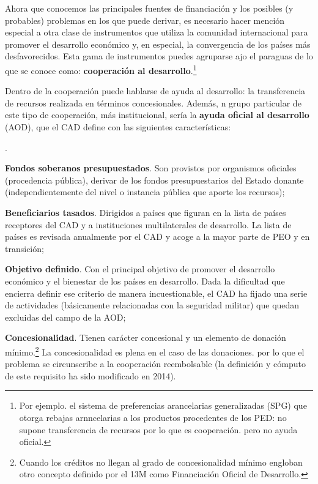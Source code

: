 \documentclass[10pt,a4paper]{article}
\newcounter{numitem}
\newenvironment{lnum}
      {\begin{list}{\arabic{numitem}.}{%
          \usecounter{numitem}%
          \setlength{\leftmargin}{1cm}%
          \setlength{\parskip}{3pt}%
          \setlength{\itemsep}{0pt}%
          \setlength{\parsep}{0pt}%
      }}
      {\end{list}}
\begin{document}
Ahora que conocemos las principales fuentes de financiación y los posibles (y probables) problemas en los que puede derivar, es necesario hacer mención especial a otra clase de instrumentos que utiliza la comunidad internacional para promover el desarrollo económico y, en especial, la convergencia de los países más desfavorecidos. Esta gama de instrumentos puedes agruparse ajo el paraguas de lo que se conoce como: \textbf{cooperación al desarrollo}.\footnote{%
    Por ejemplo. el sistema de preferencias arancelarias generalizadas (SPG) que otorga rebajas arnncelarias a los productos procedentes de los PED: no supone transferencia de recursos por lo que es cooperación. pero no ayuda oficial.
}

Dentro de la cooperación puede hablarse de ayuda al desarrollo: la transferencia de recursos realizada en términos concesionales. Además, n grupo particular de este tipo de cooperación, más institucional, sería la \textbf{ayuda oficial al desarrollo} (AOD), que el CAD define con las siguientes características:
\begin{lnum}
    \item \textbf{Fondos soberanos presupuestados}. Son provistos por organismos oficiales (procedencia pública), derivar de los fondos presupuestarios del Estado donante (independientemente del nivel o instancia pública que aporte los recursos);
    \item \textbf{Beneficiarios tasados}. Dirigidos a países que figuran en la lista de países receptores del CAD y a instituciones multilaterales de desarrollo. La lista de países es revisada anualmente por el CAD y acoge a la mayor parte de PEO y en transición;
    \item \textbf{Objetivo definido}. Con el principal objetivo de promover el desarrollo económico y el bienestar de los países en desarrollo. Dada la dificultad que encierra definir ese criterio de manera incuestionable, el CAD ha fijado una serie de actividades (básicamente relacionadas con la seguridad militar) que quedan excluidas del campo de la AOD;
    \item \textbf{Concesionalidad}. Tienen carácter concesional y un elemento de donación mínimo.\footnote{%
        Cuando los créditos no llegan al grado de concesionalidad mínimo engloban otro concepto definido por el 13M como Financiación Oficial de Desarrollo.
    } La concesionalidad es plena en el caso de las donaciones. por lo que el problema se circunscribe a la cooperación reembolsable (la definición y cómputo de este requisito ha sido modificado en 2014). 
\end{lnum}
\end{document}
